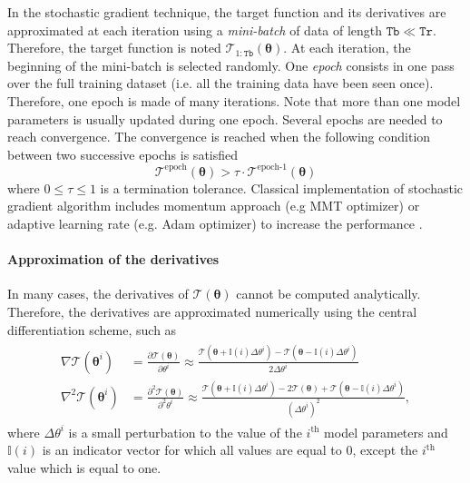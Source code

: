 In the stochastic gradient technique, the target function and its derivatives are approximated at each iteration using a \emph{mini-batch} of data of length $\mathtt{Tb} \ll \mathtt{Tr}$.
Therefore, the target function is noted $\mathcal{T}_{1:\mathtt{Tb}}(\bm{\theta})$.
At each iteration, the beginning of the mini-batch is selected randomly.
One \emph{epoch} consists in one pass over the full training dataset (i.e. all the training data have been seen once).
Therefore, one epoch is made of many iterations.
Note that more than one model parameters is usually updated during one epoch.
Several epochs are needed to reach convergence.
The convergence is reached when the following condition between two successive epochs is satisfied 
\begin{equation}
\mathcal{T}^{\text{epoch}} (\bm\theta) > \tau  \cdot \mathcal{T}^{\text{epoch-1}} (\bm\theta)
\label{EQ:SGT}
\end{equation}
where $0 \le \tau \le 1$ is a termination tolerance.
Classical implementation of stochastic gradient algorithm includes momentum approach (e.g MMT optimizer) or adaptive learning rate (e.g. Adam optimizer) to increase the performance \cite{Goodfellow-et-al-2016}.  

\paragraph{Approximation of the derivatives}

In many cases, the derivatives of $\mathcal{T}(\bm{\theta})$ cannot be computed analytically.
Therefore, the derivatives are approximated numerically using the central differentiation scheme, such as
\begin{gather}
\begin{aligned}
 \nabla \mathcal{T}(\bm\theta^{i}) & = \frac{\partial \mathcal{T} (\bm\theta) }{\partial \theta^{i}} \approx \frac{\mathcal{T} (\bm\theta + \mathbb{I}(i)\Delta \theta^{i} )  -  \mathcal{T} (\bm\theta - \mathbb{I}(i)\Delta \theta^{i} ) }{2\Delta \theta^{i}}  \\
 \nabla^{2} \mathcal{T}(\bm\theta^{i}) & = \frac{\partial^{2} \mathcal{T} (\bm\theta) }{\partial^{2} \theta^{i}} \approx \frac{\mathcal{T} (\bm\theta + \mathbb{I}(i)\Delta \theta^{i} )  -  2 \mathcal{T} (\bm\theta) +  \mathcal{T} (\bm\theta - \mathbb{I}(i)\Delta \theta^{i} ) }{(\Delta \theta^{i})^{2}},
\label{EQ:numericaldiff}
\end{aligned}
\end{gather}
where $\Delta \theta^{i}$ is a small perturbation to the value of the $i^{\text{th}}$ model parameters and $\mathbb{I}(i)$ is an indicator vector for which all values are equal to $0$, except the $i^{\text{th}}$ value which is equal to one.


